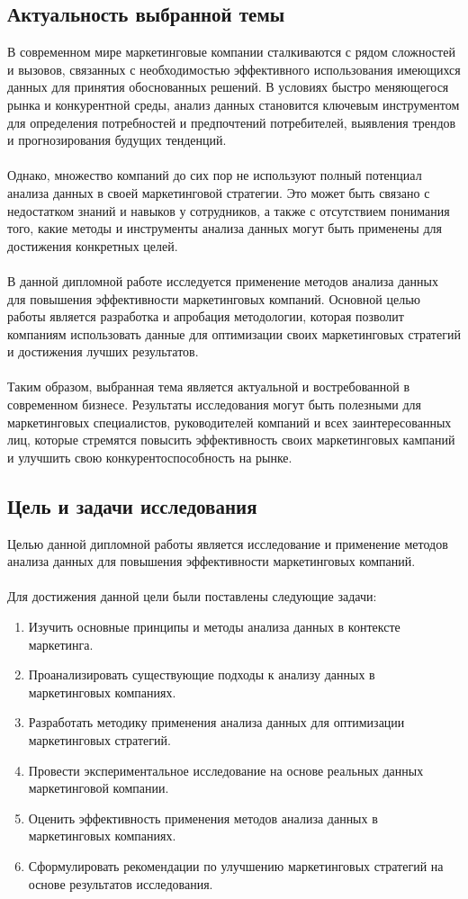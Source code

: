 \documentclass{article}
\begin{document}
\subsection{Актуальность выбранной темы}
В современном мире маркетинговые компании сталкиваются с рядом сложностей и вызовов, связанных с необходимостью эффективного использования имеющихся данных для принятия обоснованных решений. В условиях быстро меняющегося рынка и конкурентной среды, анализ данных становится ключевым инструментом для определения потребностей и предпочтений потребителей, выявления трендов и прогнозирования будущих тенденций.\\
~\\
Однако, множество компаний до сих пор не используют полный потенциал анализа данных в своей маркетинговой стратегии. Это может быть связано с недостатком знаний и навыков у сотрудников, а также с отсутствием понимания того, какие методы и инструменты анализа данных могут быть применены для достижения конкретных целей.\\
~\\
В данной дипломной работе исследуется применение методов анализа данных для повышения эффективности маркетинговых компаний. Основной целью работы является разработка и апробация методологии, которая позволит компаниям использовать данные для оптимизации своих маркетинговых стратегий и достижения лучших результатов.\\
~\\
Таким образом, выбранная тема является актуальной и востребованной в современном бизнесе. Результаты исследования могут быть полезными для маркетинговых специалистов, руководителей компаний и всех заинтересованных лиц, которые стремятся повысить эффективность своих маркетинговых кампаний и улучшить свою конкурентоспособность на рынке.
\subsection{Цель и задачи исследования}
Целью данной дипломной работы является исследование и применение методов анализа данных для повышения эффективности маркетинговых компаний.\\
~\\
Для достижения данной цели были поставлены следующие задачи:
\begin{enumerate}
\item Изучить основные принципы и методы анализа данных в контексте маркетинга.
\item Проанализировать существующие подходы к анализу данных в маркетинговых компаниях.
\item Разработать методику применения анализа данных для оптимизации маркетинговых стратегий.
\item Провести экспериментальное исследование на основе реальных данных маркетинговой компании.
\item Оценить эффективность применения методов анализа данных в маркетинговых компаниях.
\item Сформулировать рекомендации по улучшению маркетинговых стратегий на основе результатов исследования.
\end{enumerate}
\end{document}
